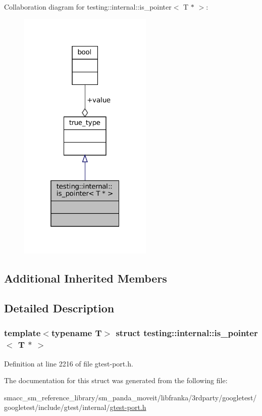 Collaboration diagram for testing\+:\+:internal\+:\+:is\+\_\+pointer$<$ T $\ast$ $>$\+:
\nopagebreak
\begin{figure}[H]
\begin{center}
\leavevmode
\includegraphics[width=181pt]{structtesting_1_1internal_1_1is__pointer_3_01T_01_5_01_4__coll__graph}
\end{center}
\end{figure}
\subsection*{Additional Inherited Members}


\subsection{Detailed Description}
\subsubsection*{template$<$typename T$>$\newline
struct testing\+::internal\+::is\+\_\+pointer$<$ T $\ast$ $>$}



Definition at line 2216 of file gtest-\/port.\+h.



The documentation for this struct was generated from the following file\+:\begin{DoxyCompactItemize}
\item 
smacc\+\_\+sm\+\_\+reference\+\_\+library/sm\+\_\+panda\+\_\+moveit/libfranka/3rdparty/googletest/googletest/include/gtest/internal/\hyperlink{gtest-port_8h}{gtest-\/port.\+h}\end{DoxyCompactItemize}
